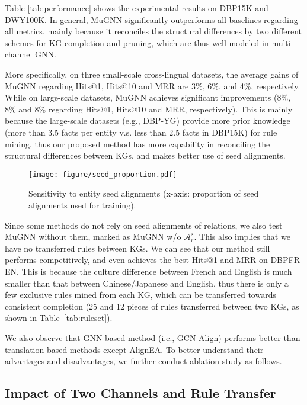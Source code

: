 \documentclass[11pt,a4paper]{article}
\begin{document}
Table \ref{tab:performance} shows the experimental results on DBP15K and DWY100K. In general, MuGNN significantly outperforms all baselines regarding all metrics, mainly because it reconciles the structural differences by two different schemes for KG completion and pruning, which are thus well modeled in multi-channel GNN.

More specifically, on three small-scale cross-lingual datasets, the average gains of MuGNN regarding Hits@1, Hits@10 and MRR are 3\%, 6\%, and 4\%, respectively. While on large-scale datasets, MuGNN achieves significant improvements (8\%, 8\% and 8\% regarding Hits@1, Hits@10 and MRR, respectively). This is mainly because the large-scale datasets (e.g., DBP-YG) provide more prior knowledge (more than 3.5 facts per entity v.s. less than 2.5 facts in DBP15K) for rule mining, thus our proposed method has more capability in reconciling the structural differences between KGs, and makes better use of seed alignments.

\begin{figure*}[htb]
	\centerline{\texttt{[image: figure/seed\_proportion.pdf]}}
	\caption{Sensitivity to entity seed alignments (x-axis: proportion of seed alignments used for training).}
	\label{fig:seed}
\end{figure*}

Since some methods do not rely on seed alignments of relations, we also test MuGNN without them, marked as MuGNN w/o $\mathcal{A}_r^s$. This also implies that we have no transferred rules between KGs. We can see that our method still performs competitively, and even achieves the best Hits@1 and MRR on {DBP\tiny{FR-EN}}. This is because the culture difference between French and English is much smaller than that between Chinese/Japanese and English, thus there is only a few exclusive rules mined from each KG, which can be transferred towards consistent completion (25 and 12 pieces of rules transferred between two KGs, as shown in Table~\ref{tab:ruleset}).

We also observe that GNN-based method (i.e., GCN-Align) performs better than translation-based methods except AlignEA. To better understand their advantages and disadvantages, we further conduct ablation study as follows.

\subsection{Impact of Two Channels and Rule Transfer}
\end{document}
